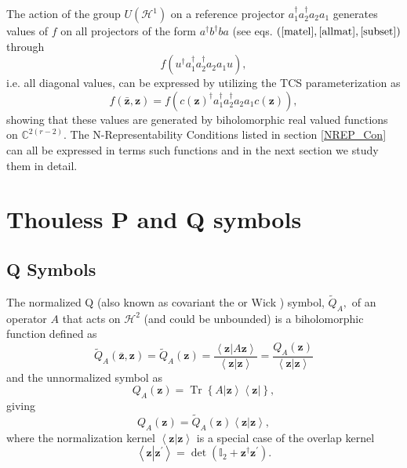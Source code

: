 \documentclass[aps,preprint]{revtex4}%
\begin{document}
The action of the group $U\left(  \mathcal{H}^{1}\right)  $ on a reference
projector $a_{1}^{\dagger}a_{2}^{\dagger}a_{2}a_{1}$ generates values of $f$
on all projectors of the form $a^{\dagger}b^{\dagger}ba$ (see eqs. $\left(
\ref{matel},\ref{allmat},\ref{subset}\right)  $ through
\begin{equation}
f\left(  u^{\dagger}a_{1}^{\dagger}a_{2}^{\dagger}a_{2}a_{1}u\right)  ,
\end{equation}
i.e. all diagonal values, can be expressed by utilizing the TCS
parameterization as
\begin{equation}
f\left(  \mathbf{\bar{z},z}\right)  =f\left(  c\left(  \mathbf{z}\right)
^{\dagger}a_{1}^{\dagger}a_{2}^{\dagger}a_{2}a_{1}c\left(  \mathbf{z}\right)
\right)  ,
\end{equation}
showing that these values are generated by biholomorphic real valued functions
on $\mathbb{C}^{2\left(  r-2\right)  }.$ The N-Representability Conditions
listed in section \ref{NREP_Con} can all be expressed in terms such functions
and in the next section we study them in detail.

\section{Thouless P and Q symbols \label{P and Q Symbols}}

\subsection{Q Symbols}

The normalized Q \cite{Lieb} (also known as covariant the \cite{Berizin} or
Wick \cite{Peremelov}) symbol, $\tilde{Q}_{A},$ of an operator $A$ that acts
on $\mathcal{H}^{2}$ (and could be unbounded) is a biholomorphic function
defined as
\begin{equation}
\tilde{Q}_{A}\left(  \mathbf{\bar{z}},\mathbf{z}\right)  =\tilde{Q}_{A}\left(
\mathbf{z}\right)  =\frac{\left\langle \mathbf{z}\left\vert A\mathbf{z}%
\right.  \right\rangle }{\left\langle \mathbf{z}\left\vert \mathbf{z}\right.
\right\rangle }=\frac{Q_{A}\left(  \mathbf{z}\right)  }{\left\langle
\mathbf{z}\left\vert \mathbf{z}\right.  \right\rangle }%
\end{equation}
and the unnormalized symbol as
\begin{equation}
Q_{A}\left(  \mathbf{z}\right)  =\operatorname*{Tr}\left\{  A\left\vert
\mathbf{z}\right\rangle \left\langle \mathbf{z}\right\vert \right\}  ,
\end{equation}
giving
\begin{equation}
Q_{A}\left(  \mathbf{z}\right)  =\tilde{Q}_{A}\left(  \mathbf{z}\right)
\left\langle \mathbf{z}\left\vert \mathbf{z}\right.  \right\rangle ,
\end{equation}
where the normalization kernel $\left\langle \mathbf{z}\left\vert
\mathbf{z}\right.  \right\rangle $ is a special case of the overlap kernel
\begin{equation}
\left\langle \mathbf{z\left\vert \mathbf{z}^{\prime}\right.  }\right\rangle
=\det\left(  \mathbb{I}_{2}+\mathbf{z}^{\dagger}\mathbf{z}^{\prime}\right)  .
\end{equation}
\end{document}
